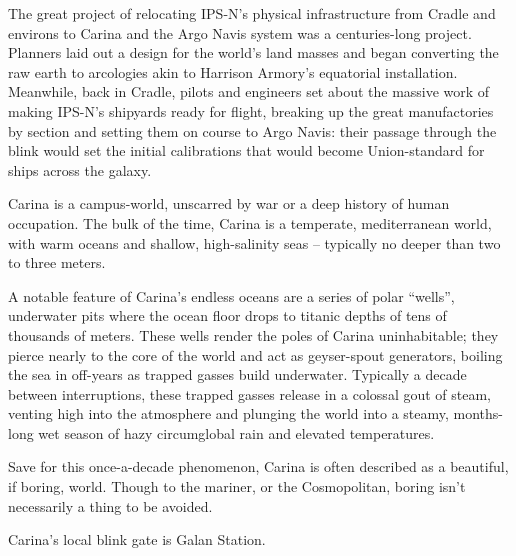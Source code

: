 The great project of relocating IPS-N’s physical infrastructure from Cradle and environs to Carina
and the Argo Navis system was a centuries-long project. Planners laid out a design for the world’s
land masses and began converting the raw earth to arcologies akin to Harrison Armory’s
equatorial installation. Meanwhile, back in Cradle, pilots and engineers set about the massive
work of making IPS-N’s shipyards ready for flight, breaking up the great manufactories by section
and setting them on course to Argo Navis: their passage through the blink would set the initial
calibrations that would become Union-standard for ships across the galaxy.




Carina is a campus-world, unscarred by war or a deep history of human occupation. The bulk of
the time, Carina is a temperate, mediterranean world, with warm oceans and shallow, high-salinity
seas -- typically no deeper than two to three meters.

A notable feature of Carina’s endless oceans are a series of polar “wells”, underwater pits where
the ocean floor drops to titanic depths of tens of thousands of meters. These wells render the
poles of Carina uninhabitable; they pierce nearly to the core of the world and act as geyser-spout
generators, boiling the sea in off-years as trapped gasses build underwater. Typically a decade
between interruptions, these trapped gasses release in a colossal gout of steam, venting high into
the atmosphere and plunging the world into a steamy, months-long wet season of hazy
circumglobal rain and elevated temperatures.

Save for this once-a-decade phenomenon, Carina is often described as a beautiful, if boring,
world. Though to the mariner, or the Cosmopolitan, boring isn’t necessarily a thing to be avoided.

Carina’s local blink gate is Galan Station.
